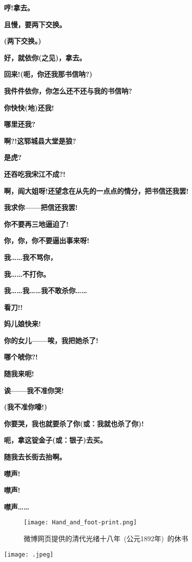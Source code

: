 \textbf{哼!拿去。}

\textbf{且慢，要两下交换。}

\textbf{(两下交换。)}

\textbf{好，就依你(之见)，拿去。}

\textbf{回来!(呃，你还我那书信呐?)}

\textbf{我件件依你，你怎么还不还与我的书信呐?}

\textbf{你快快(地)还我!}

\textbf{哪里还我?}

\textbf{啊?!这郓城县大堂是狼?}

\textbf{是虎?}

\textbf{还吞吃我宋江不成?!}

\textbf{啊，阎大姐呀!还望念在从先的一点点的情分，把书信还我罢!}

\textbf{我求你------把信还我罢!}

\textbf{你不要再三地逼迫了!}

\textbf{你，你，你不要逼出事来呀!}

\textbf{我\ldots{}\ldots{}我不骂你，}

\textbf{我\ldots{}\ldots{}不打你。}

\textbf{我\ldots{}\ldots{}我\ldots{}\ldots{}我不敢杀你\ldots{}\ldots{}}

\textbf{看刀!!}

\textbf{妈儿娘快来!}

\textbf{你的女儿------唉，我把她杀了!}

\textbf{哪个唬你?!}

\textbf{随我来呃!}

\textbf{诶------我不准你哭!}

\textbf{(我不准你嚎!)}

\textbf{你要哭，我也就要杀了你(或：我就也杀了你)!}

\textbf{呃，拿这锭金子(或：银子)去买。}

\textbf{随我去长街去抬啊。}

\textbf{噤声!}

\textbf{噤声!}

\textbf{噤声\ldots{}\ldots{}}

\vskip 5pt
{}
\begin{figure}[h!]
\centering
\texttt{[image: Hand\_and\_foot-print.png]}
\caption*{\hei 微博网页提供的清代光绪十八年~(公元1892年)~的休书}
\label{Collect_Liu_Wu}
\end{figure}
\texttt{[image: .jpeg]}

